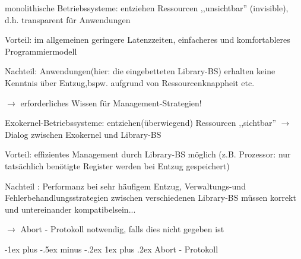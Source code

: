\documentclass[a4paper]{article}
\makeatletter
\renewcommand{\subsubsection}{\@startsection{subsubsection}{3}{0mm}%
 {-1ex plus -.5ex minus -.2ex}%
 {1ex plus .2ex}%
 {\normalfont\small\bfseries}}
\makeatother
\begin{document}
\begin{multicols}{3}
    \begin{itemize*}
        \item
        monolithische Betriebssysteme: entziehen Ressourcen ,,unsichtbar''
        (invisible), d.h. transparent für Anwendungen
        \begin{itemize*}
            \item Vorteil: im allgemeinen geringere Latenzzeiten, einfacheres und komfortableres Programmiermodell
            \item Nachteil: Anwendungen(hier: die eingebetteten Library-BS) erhalten keine Kenntnis über Entzug,bspw. aufgrund von Ressourcenknappheit etc.
            \item[$\rightarrow$] erforderliches Wissen für Management-Strategien!
        \end{itemize*}
        \item
        Exokernel-Betriebssysteme: entziehen(überwiegend) Ressourcen
        ,,sichtbar'' $\rightarrow$ Dialog zwischen Exokernel
        und Library-BS
        \begin{itemize*}
            \item Vorteil: effizientes Management durch Library-BS möglich (z.B. Prozessor: nur tatsächlich benötigte Register werden bei Entzug gespeichert)
            \item Nachteil : Performanz bei sehr häufigem Entzug, Verwaltungs-und Fehlerbehandlungsstrategien zwischen verschiedenen Library-BS müssen korrekt und untereinander kompatibelsein...
            \item[$\rightarrow$] Abort - Protokoll notwendig, falls dies nicht gegeben ist
        \end{itemize*}
    \end{itemize*}


    \subsubsection{Abort - Protokoll}


\end{multicols}
\end{document}
